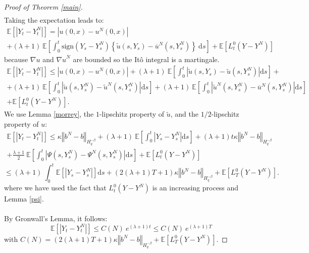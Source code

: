 \documentclass[11pt]{enstaPRE}
\newcommand{\norme}[1]{\left\Vert #1\right\Vert}
\newcommand{\E}{\mathbb{E}}
\newcommand{\di}{\mathrm{d}}
\begin{document}
\begin{proof}[Proof of Theorem \ref{main}]
\begin{multline*}
    \end{multline*}    
    Taking the expectation leads to:
    \begin{multline*}
    \E\left[\left|Y_t-Y_t^N\right|\right] =  \left|u(0,x)-u^N(0,x)\right|\\ + (\lambda + 1)\ \E\left[\int_0^t\mathrm{sign}(Y_s-Y_s^N)\left\{\widetilde{u}\left(s,Y_s\right)-\overline{u}^N\left(s,Y_s^N\right)\right\}\ \di s\right] + \E \left[L_t^0(Y-Y^N)\right]
    \end{multline*}
    because ${\nabla u}$ and ${\nabla u}^N$ are bounded so the Itô integral is a martingale.    
    \begin{multline*}
    \E\left[\left|Y_t-Y_t^N\right|\right]\leq \left|u(0,x)-u^N(0,x)\right| + (\lambda + 1)\ \E\left[\int_0^t\left|\widetilde{u}\left(s,Y_s\right)-\widetilde{u}\left(s,Y_s^N\right)\right| \di s\right]+ \\ + (\lambda + 1)\ \E\left[\int_0^t\left|\widetilde{u}\left(s,Y_s^N\right)-\widetilde{u}^N\left(s,Y_s^N\right)\right| \di s\right] + (\lambda + 1)\ \E\left[\int_0^t\left|\widetilde{u}^N\left(s,Y_s^N\right)-\overline{u}^N\left(s,Y_s^N\right)\right| \di s\right]\\ + \E \left[L_t^0(Y-Y^N)\right].
    \end{multline*}
    We use Lemma \ref{morrey}, the $1$-lipschitz property of $\widetilde{u}$, and the $1/2$-lipschitz property of $u$:
    \begin{multline*}
    \E\left[\left|Y_t-Y_t^N\right|\right]\leq \kappa\norme{b^N-b}_{H^{-\beta}_{q}} + (\lambda + 1)\ \E\left[\int_0^t\left|Y_s-Y_s^N\right| \di s\right] + (\lambda + 1)t\kappa\norme{b^N-b}_{H^{-\beta}_{q}}\\+ \frac{\lambda + 1}{2}\ \E\left[\int_0^t\left|\Psi\left(s,Y_s^N\right)-\Psi^N\left(s,Y_s^N\right)\right| \di s\right]  + \E \left[L_t^0(Y-Y^N)\right]
    \end{multline*}    
    \begin{equation*}
    \leq (\lambda + 1)\ \int_0^t\E\left[\left|Y_s-Y_s^N\right|\right] \di s + (2(\lambda + 1)T+1)\kappa\norme{b^N-b}_{H^{-\beta}_{q}}  + \E \left[L_T^0(Y-Y^N)\right].
    \end{equation*}
    where we have used the fact that $L_t^0(Y-Y^N)$ is an increasing process and Lemma \ref{psi}.    
    \paragraph{}
    By Gronwall's Lemma, it follows:
    \begin{equation}\label{gronwall}
    \E\left[\left|Y_t-Y_t^N\right|\right] \leq C(N)\ e^{(\lambda + 1)t}\leq C(N)\ e^{(\lambda + 1)T}
    \end{equation}
    with $C(N) = (2(\lambda + 1)T+1)\kappa\norme{b^N-b}_{H^{-\beta}_{q}}  + \E \left[L_T^0(Y-Y^N)\right].$      
    

\end{proof}
\end{document}
